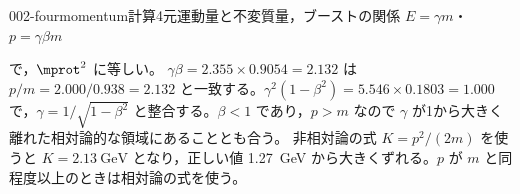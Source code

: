 \documentclass[uplatex,dvipdfmx,a4paper,11pt]{jsarticle}
\begin{document}
\begin{mondai}{002-fourmomentum}{計算}{4元運動量と不変質量，ブーストの関係 $E=\gamma m$・$p=\gamma\beta m$}
\begin{tadashii}
で，$\mprot^2$ に等しい。
\kenzan $\gamma\beta=2.355\times0.9054=2.132$ は $p/m=2.000/0.938=2.132$ と一致する。$\gamma^2(1-\beta^2)=5.546\times0.1803=1.000$ で，$\gamma=1/\sqrt{1-\beta^2}$ と整合する。$\beta<1$ であり，$p>m$ なので $\gamma$ が1から大きく離れた相対論的な領域にあることとも合う。
\tsumazuki 非相対論の式 $K=p^2/(2m)$ を使うと $K=\qty{2.13}{\giga\electronvolt}$ となり，正しい値 \qty{1.27}{\giga\electronvolt} から大きくずれる。$p$ が $m$ と同程度以上のときは相対論の式を使う。
\end{tadashii}
\end{mondai}
\end{document}
